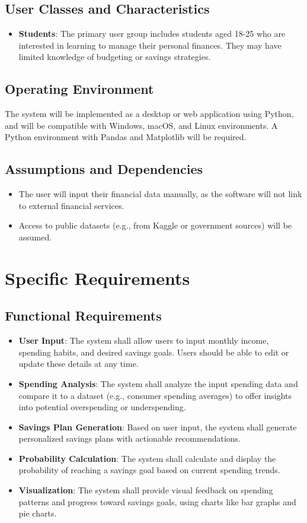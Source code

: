 \documentclass{article}
\begin{document}
\subsection{User Classes and Characteristics}
\begin{itemize}
    \item \textbf{Students}: The primary user group includes students aged 18-25 who are interested in learning to manage their personal finances. They may have limited knowledge of budgeting or savings strategies.
\end{itemize}

\subsection{Operating Environment}
The system will be implemented as a desktop or web application using Python, and will be compatible with Windows, macOS, and Linux environments. A Python environment with Pandas and Matplotlib will be required.

\subsection{Assumptions and Dependencies}
\begin{itemize}
    \item The user will input their financial data manually, as the software will not link to external financial services.
    \item Access to public datasets (e.g., from Kaggle or government sources) will be assumed.
\end{itemize}

\section{Specific Requirements}
\subsection{Functional Requirements}
\begin{itemize}
    \item \textbf{User Input}: The system shall allow users to input monthly income, spending habits, and desired savings goals. Users should be able to edit or update these details at any time.
    \item \textbf{Spending Analysis}: The system shall analyze the input spending data and compare it to a dataset (e.g., consumer spending averages) to offer insights into potential overspending or underspending.
    \item \textbf{Savings Plan Generation}: Based on user input, the system shall generate personalized savings plans with actionable recommendations.
    \item \textbf{Probability Calculation}: The system shall calculate and display the probability of reaching a savings goal based on current spending trends.
    \item \textbf{Visualization}: The system shall provide visual feedback on spending patterns and progress toward savings goals, using charts like bar graphs and pie charts.
\end{itemize}
\end{document}
